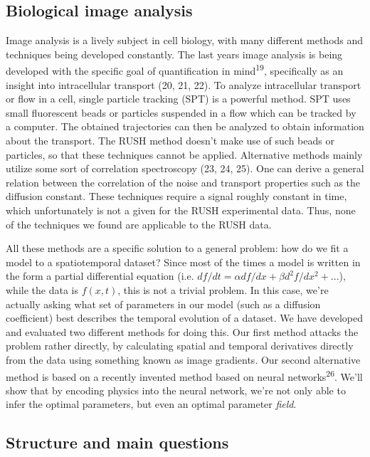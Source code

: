 \documentclass[12pt,a4paper,]{Dissertate}
\begin{document}
\hypertarget{biological-image-analysis}{%
\subsection{Biological image analysis}\label{biological-image-analysis}}

Image analysis is a lively subject in cell biology, with many different
methods and techniques being developed constantly. The last years image
analysis is being developed with the specific goal of quantification in
mind\textsuperscript{19}, specifically as an insight into intracellular
transport (20, 21, 22). To analyze intracellular transport or flow in a
cell, single particle tracking (SPT) is a powerful method. SPT uses
small fluorescent beads or particles suspended in a flow which can be
tracked by a computer. The obtained trajectories can then be analyzed to
obtain information about the transport. The RUSH method doesn't make use
of such beads or particles, so that these techniques cannot be applied.
Alternative methods mainly utilize some sort of correlation spectroscopy
(23, 24, 25). One can derive a general relation between the correlation
of the noise and transport properties such as the diffusion constant.
These techniques require a signal roughly constant in time, which
unfortunately is not a given for the RUSH experimental data. Thus, none
of the techniques we found are applicable to the RUSH data.

All these methods are a specific solution to a general problem: how do
we fit a model to a spatiotemporal dataset? Since most of the times a
model is written in the form a partial differential equation (i.e.
\(df/dt = \alpha df/dx+\beta d^2f/dx^2+...\)), while the data is
\(f(x,t)\), this is not a trivial problem. In this case, we're actually
asking what set of parameters in our model (such as a diffusion
coefficient) best describes the temporal evolution of a dataset. We have
developed and evaluated two different methods for doing this. Our first
method attacks the problem rather directly, by calculating spatial and
temporal derivatives directly from the data using something known as
image gradients. Our second alternative method is based on a recently
invented method based on neural networks\textsuperscript{26}. We'll show
that by encoding physics into the neural network, we're not only able to
infer the optimal parameters, but even an optimal parameter
\emph{field}.

\hypertarget{structure-and-main-questions}{%
\subsection{Structure and main
questions}\label{structure-and-main-questions}}
\end{document}
